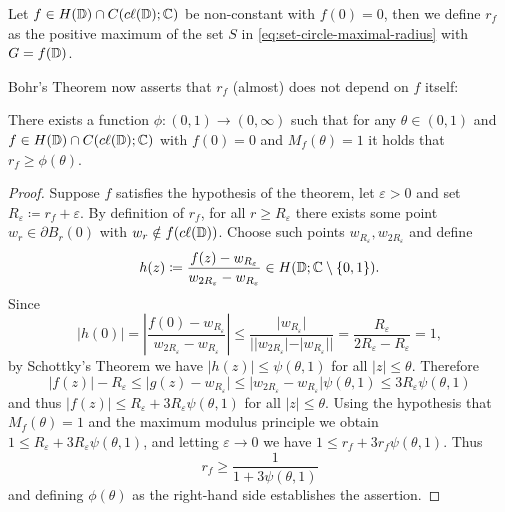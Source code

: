\begin{definition}
    Let $f \in H(\mathbb{D}) \cap C(c\ell({\mathbb{D}}); \mathbb{C})$ be non-constant with $f(0) = 0$, then we define $r_f$ as the positive maximum of the set $S$ in \eqref{eq:set-circle-maximal-radius} with $G = f(\mathbb{D})$.
\end{definition}

Bohr's Theorem now asserts that $r_f$ (almost) does not depend on $f$ itself:

\begin{theorem}[Bohr] \label{thm:bohr}
    There exists a function ${\phi : (0, 1) \to (0, \infty)}$ such that for any $\theta \in (0, 1)$ and $f \in H(\mathbb{D}) \cap C(c\ell({\mathbb{D}}); \mathbb{C})$ with $f(0) = 0$ and $M_f(\theta) = 1$ it holds that $r_f \geq \phi(\theta)$.
\end{theorem}

\begin{proof}
    Suppose $f$ satisfies the hypothesis of the theorem, let $\varepsilon > 0$ and set $R_\varepsilon \coloneqq r_f + \varepsilon$. By definition of $r_f$, for all $r \geq R_\varepsilon$ there exists some point $w_r \in \partial B_r(0)$ with $w_r \notin f(c\ell({\mathbb{D}}))$. Choose such points $w_{R_\varepsilon}, w_{2 R_\varepsilon}$ and define
    $$ h(z) \coloneqq \frac{f(z) - w_{R_\varepsilon}}{w_{2 R_\varepsilon} - w_{R_\varepsilon}} \in H(\mathbb{D}; \mathbb{C} \setminus \{ 0, 1 \}). $$
    Since
    $$ \vert h(0) \vert = \left\vert \frac{f(0) - w_{R_\varepsilon}}{w_{2 R_\varepsilon} - w_{R_\varepsilon}} \right\vert \leq \frac{\vert w_{R_\varepsilon} \vert}{\vert \vert w_{2 R_\varepsilon} \vert - \vert w_{R_\varepsilon} \vert \vert} = \frac{R_\varepsilon}{2 R_\varepsilon - R_\varepsilon} = 1, $$
    by Schottky's Theorem we have $\vert h(z) \vert \leq \psi(\theta, 1)$ for all $\vert z \vert \leq \theta$. Therefore
    $$ \vert f(z) \vert - R_\varepsilon \leq \vert g(z) - w_{R_\varepsilon} \vert \leq \vert w_{2 R_\varepsilon} - w_{R_\varepsilon} \vert \psi(\theta, 1) \leq 3 R_\varepsilon \psi(\theta, 1) $$
    and thus $\vert f(z) \vert \leq R_\varepsilon + 3 R_\varepsilon \psi(\theta, 1)$ for all $\vert z \vert \leq \theta$. Using the hypothesis that $M_f(\theta) = 1$ and the maximum modulus principle we obtain $1 \leq R_\varepsilon + 3 R_\varepsilon \psi(\theta, 1)$, and letting $\varepsilon \to 0$ we have $1 \leq r_f + 3 r_f \psi(\theta, 1)$. Thus
    $$ r_f \geq \frac{1}{1 + 3 \psi(\theta, 1)}$$
    and defining $\phi(\theta)$ as the right-hand side establishes the assertion.
\end{proof}


